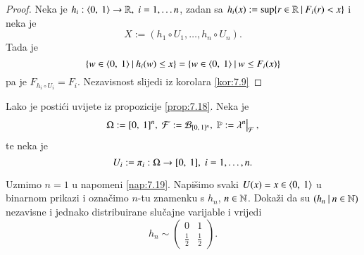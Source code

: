 \begin{proof}
    Neka je $h_i : \langle {0}, \: {1} \rangle \to \mathbb{R}, \; i = 1, \ldots n$, zadan sa $h_i (x) := \sup \{{r \in \mathbb{R}} \: | \: {F_i (r) < x}\}$ i neka je
    \begin{equation*}
        X := (h_1 \circ U_1, \ldots, h_n \circ U_n).
    \end{equation*} 
    Tada je
    \begin{equation*}
        \{{w \in \langle {0}, \: {1} \rangle} \: | \: {h_i(w) \leq x}\} = \{{w \in \langle {0}, \: {1} \rangle} \: | \: {w \leq F_i (x)}\}
    \end{equation*}
    pa je $F_{h_i \circ U_i} = F_i$.
    Nezavisnost slijedi iz korolara \ref{kor:7.9}
\end{proof}

\begin{nap} \label{nap:7.19}
    Lako je posti\' ci uvijete iz propozicije \ref{prop:7.18}.
    Neka je
    \begin{equation*}
        \Omega := \segment{0}{1}^n, \; \famF := \borel{\segment{0}{1}^n}, \; \masP := \restr{\lambda^n}{\famF},
    \end{equation*}
    te neka je
    \begin{equation*}
        U_i := \pi_i : \Omega \to [{0}, \:{1}], \; i = 1, \ldots, n.
    \end{equation*}
\end{nap}

\begin{zad} \label{zad:7.20}
    Uzmimo $n = 1$ u napomeni \ref{nap:7.19}. Napi\v simo svaki $U(x) = x \in \langle {0}, \: {1} \rangle$ u binarnom prikazi i ozna\v cimo $n$-tu znamenku s $h_n$, $n \in \mathbb{N}$.
    Doka\v zi da su $({h_n} \: | \: {n \in \mathbb{N}})$ nezavisne i jednako distribuirane slu\v cajne varijable i vrijedi
    \begin{equation*}
        h_n \sim
        \begin{pmatrix}
            0& 1\\
            \frac{1}{2}& \frac{1}{2}    
        \end{pmatrix}.
    \end{equation*}
\end{zad}